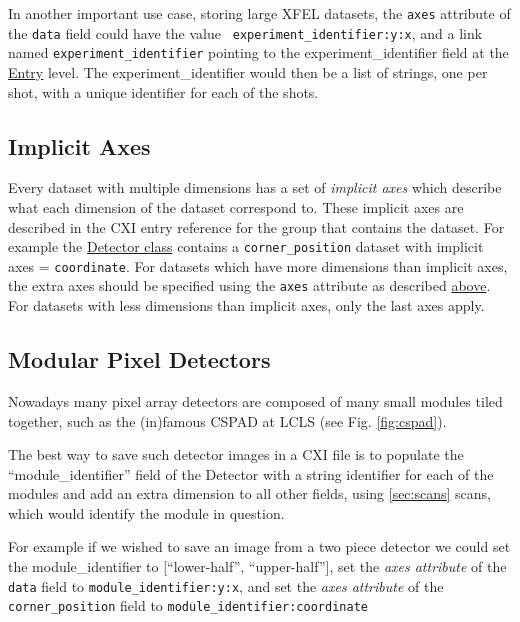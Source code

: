 \documentclass[usletter,11pt]{article}
\begin{document}
In another important use case, storing large XFEL datasets, the {\tt axes} 
attribute of the {\tt data} field could have the value {\tt
experiment\_identifier:y:x}, and a link named {\tt experiment\_identifier}
pointing to the experiment\_identifier field at the \hyperref[table:entry]{Entry} level.
The experiment\_identifier would then be a list of strings, one per shot, 
with a unique identifier for each of the shots.

\subsection{Implicit Axes}
\label{subsec:implaxes}

Every dataset with multiple dimensions has a set of {\em implicit axes} which
describe what each dimension of the dataset correspond to. These implicit axes
are described in the CXI entry reference for the group that contains the
dataset. For example the \hyperref[table:detector]{Detector class} contains a
{\tt corner\_position} dataset with implicit axes = {\tt coordinate}. For
datasets which have more dimensions than implicit axes, the extra axes should be
specified using the {\tt axes} attribute as described \hyperref[subsec:dimscales]{above}. For datasets with
less dimensions than implicit axes, only the last axes apply. 

\subsection{Modular Pixel Detectors}
\label{subsec:modularDetectors}

Nowadays many pixel array detectors are composed of many small modules tiled
together, such as the (in)famous CSPAD at LCLS (see Fig. \ref{fig:cspad}).

The best way to save such detector images in a CXI file is to populate the 
``module\_identifier'' field of the Detector with a string identifier for each of
the modules and add an extra dimension to all other fields, using
\ref{sec:scans} scans, which would identify the module in question. 

For example if we wished to save an image from a two piece detector we could set
the module\_identifier to [``lower-half'', ``upper-half''], set the {\em
  axes attribute} of the {\tt data} field to {\tt module\_identifier:y:x},
and set the  {\em axes attribute} of the {\tt corner\_position} field to
{\tt module\_identifier:coordinate}
\end{document}
